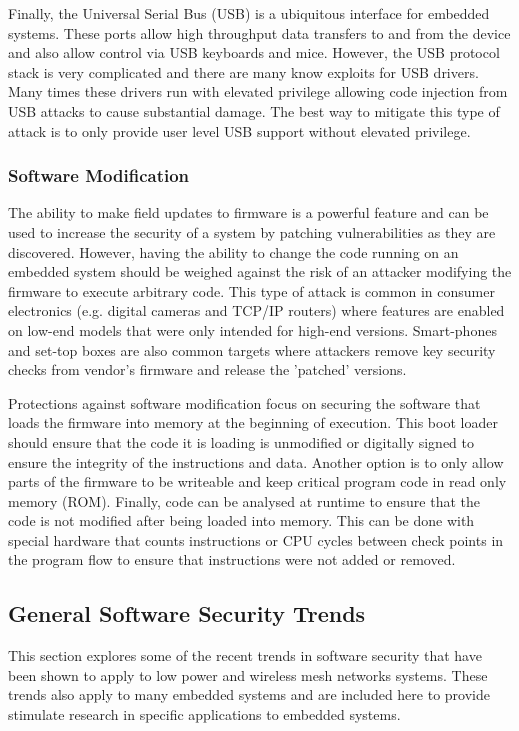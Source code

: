 \documentclass[final,conference,11pt]{IEEEtran}
\begin{document}
Finally, the Universal Serial Bus (USB) is a ubiquitous interface for embedded systems.  These ports allow high throughput data transfers to and from the device and also allow control via USB keyboards and mice.  However, the USB protocol stack is very complicated and there are many know exploits for USB drivers.  Many times these drivers run with elevated privilege allowing code injection from USB attacks to cause substantial damage.  The best way to mitigate this type of attack is to only provide user level USB support without elevated privilege. \cite{Pham2011}

\subsubsection{Software Modification}
The ability to make field updates to firmware is a powerful feature and can be used to increase the security of a system by patching vulnerabilities as they are discovered.  However, having the ability to change the code running on an embedded system should be weighed against the risk of an attacker modifying the firmware to execute arbitrary code. This type of attack is common in consumer electronics (e.g. digital cameras and TCP/IP routers)  where features are enabled on low-end models that were only intended for high-end versions.  Smart-phones and set-top boxes are also common targets where attackers remove key security checks from vendor's firmware and release the 'patched' versions. \cite{Patel2011}

Protections against software modification focus on securing the software that loads the firmware into memory at the beginning of execution.  This boot loader should ensure that the code it is loading is unmodified or digitally signed to ensure the integrity of the instructions and data. Another option is to only allow parts of the firmware to be writeable and keep critical program code in read only memory (ROM). Finally, code can be analysed at runtime to ensure that the code is not modified after being loaded into memory.  This can be done with special hardware that counts instructions or CPU cycles between check points in the program flow to ensure that instructions were not added or removed. \cite{Gelbart2009,Basile2012}

\subsection{General Software Security Trends}

This section explores some of the recent trends in software security that have been shown to apply to low power and wireless mesh networks systems. These trends also apply to many embedded systems and are included here to provide stimulate research in specific applications to embedded systems.
\end{document}
